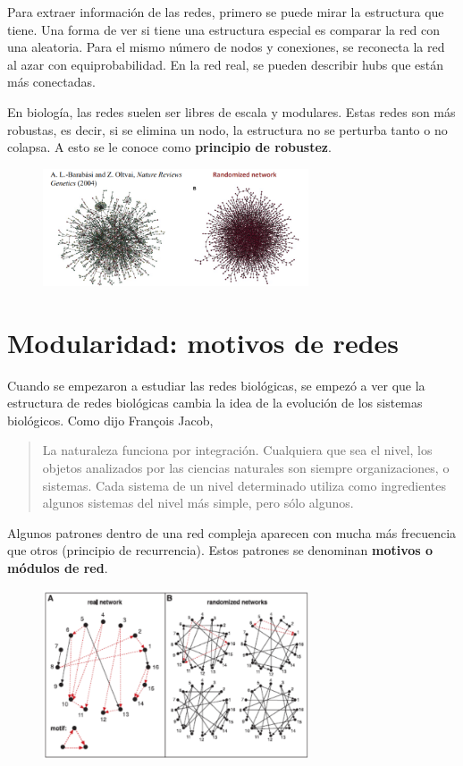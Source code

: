 Para extraer información de las redes, primero se puede mirar la estructura que tiene. Una forma de ver si tiene una estructura especial es comparar la red con una aleatoria. Para el mismo número de nodos y conexiones, se reconecta la red al azar con equiprobabilidad. En la red real, se pueden describir hubs que están más conectadas. 

En biología, las redes suelen ser libres de escala y modulares. Estas redes son más robustas, es decir, si se elimina un nodo, la estructura no se perturba tanto o no colapsa. A esto se le conoce como \textbf{principio de robustez}.

\begin{figure}[h]
\centering
\includegraphics[width = 0.7\textwidth]{figs/biological-network.png}
\end{figure}

\section{Modularidad: motivos de redes}
Cuando se empezaron a estudiar las redes biológicas, se empezó a ver que la estructura de redes biológicas cambia la idea de la evolución de los sistemas biológicos. Como dijo François Jacob, 
\begin{quotation}
La naturaleza funciona por integración. Cualquiera que sea el nivel, los objetos analizados por las ciencias naturales son siempre organizaciones, o sistemas. Cada sistema de un nivel determinado utiliza como ingredientes algunos sistemas del nivel más simple, pero sólo algunos.
\end{quotation}

Algunos patrones dentro de una red compleja aparecen con mucha más frecuencia que otros (principio de recurrencia). Estos patrones se denominan \textbf{motivos o módulos de red}.

\begin{figure}[h]
\centering
\includegraphics[width = 0.7\textwidth]{figs/motivo-redes.png}
\end{figure}


